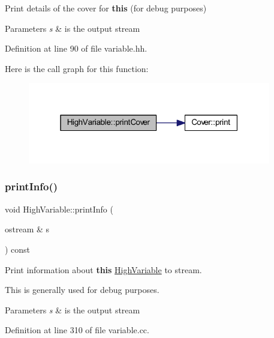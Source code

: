 Print details of the cover for {\bfseries{this}} (for debug purposes) 


\begin{DoxyParams}{Parameters}
{\em s} & is the output stream \\
\hline
\end{DoxyParams}


Definition at line 90 of file variable.\+hh.

Here is the call graph for this function\+:
\nopagebreak
\begin{figure}[H]
\begin{center}
\leavevmode
\includegraphics[width=301pt]{class_high_variable_ad550ad1465e95cb3b114ee9d6f4d5630_cgraph}
\end{center}
\end{figure}
\mbox{\label{class_high_variable_a3d0f81187b11b2d9a26e6afdfc48ae6a}} 
\subsubsection{\texorpdfstring{printInfo()}{printInfo()}}
{\footnotesize\ttfamily void High\+Variable\+::print\+Info (\begin{DoxyParamCaption}\item[{ostream \&}]{s }\end{DoxyParamCaption}) const}



Print information about {\bfseries{this}} \mbox{\hyperlink{class_high_variable}{High\+Variable}} to stream. 

This is generally used for debug purposes. 
\begin{DoxyParams}{Parameters}
{\em s} & is the output stream \\
\hline
\end{DoxyParams}


Definition at line 310 of file variable.\+cc.

\mbox{\label{class_high_variable_a707f342c2072c5b7f52d24e64751d31a}} 
